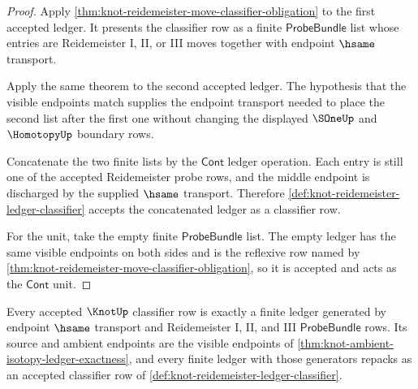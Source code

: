 \begin{proof}
Apply \autoref{thm:knot-reidemeister-move-classifier-obligation} to the first
accepted ledger. It presents the classifier row as a finite
$\mathsf{ProbeBundle}$ list whose entries are Reidemeister I, II, or III moves
together with endpoint $\hsame$ transport.

Apply the same theorem to the second accepted ledger. The hypothesis that the
visible endpoints match supplies the endpoint transport needed to place the
second list after the first one without changing the displayed $\SOneUp$ and
$\HomotopyUp$ boundary rows.

Concatenate the two finite lists by the $\mathsf{Cont}$ ledger operation.
Each entry is still one of the accepted Reidemeister probe rows, and the
middle endpoint is discharged by the supplied $\hsame$ transport. Therefore
\autoref{def:knot-reidemeister-ledger-classifier} accepts the concatenated
ledger as a classifier row.

For the unit, take the empty finite $\mathsf{ProbeBundle}$ list. The empty
ledger has the same visible endpoints on both sides and is the reflexive row
named by \autoref{thm:knot-reidemeister-move-classifier-obligation}, so it is
accepted and acts as the $\mathsf{Cont}$ unit.
\end{proof}

\begin{theorem}\label{thm:knot-classifier-ledger-completeness}
Every accepted $\KnotUp$ classifier row is exactly a finite ledger generated
by endpoint $\hsame$ transport and Reidemeister I, II, and III
$\mathsf{ProbeBundle}$ rows. Its source and ambient endpoints are the visible
endpoints of \autoref{thm:knot-ambient-isotopy-ledger-exactness}, and every
finite ledger with those generators repacks as an accepted classifier row of
\autoref{def:knot-reidemeister-ledger-classifier}.
\end{theorem}

